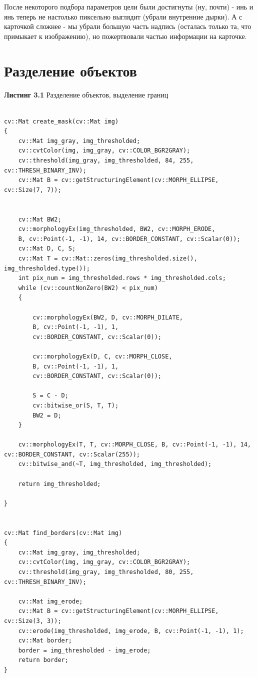 \noindent После некоторого подбора параметров цели были достигнуты (ну, почти) - инь и янь теперь не настолько пиксельно выглядит (убрали внутренние дырки). А с карточкой сложнее - мы убрали большую часть надпись (осталась только та, что примыкает к изображению), но пожертвовали частью информации на карточке.
\newpage
\section{Разделение объектов}
\noindent \textbf{Листинг 3.1} Разделение объектов, выделение границ
\begin{lstlisting}

cv::Mat create_mask(cv::Mat img)
{
    cv::Mat img_gray, img_thresholded;
    cv::cvtColor(img, img_gray, cv::COLOR_BGR2GRAY);
    cv::threshold(img_gray, img_thresholded, 84, 255, cv::THRESH_BINARY_INV);
    cv::Mat B = cv::getStructuringElement(cv::MORPH_ELLIPSE, cv::Size(7, 7));


    cv::Mat BW2;
    cv::morphologyEx(img_thresholded, BW2, cv::MORPH_ERODE, 
    B, cv::Point(-1, -1), 14, cv::BORDER_CONSTANT, cv::Scalar(0));
    cv::Mat D, C, S;
    cv::Mat T = cv::Mat::zeros(img_thresholded.size(), img_thresholded.type());
    int pix_num = img_thresholded.rows * img_thresholded.cols;
    while (cv::countNonZero(BW2) < pix_num)
    {

        cv::morphologyEx(BW2, D, cv::MORPH_DILATE, 
        B, cv::Point(-1, -1), 1,
        cv::BORDER_CONSTANT, cv::Scalar(0));

        cv::morphologyEx(D, C, cv::MORPH_CLOSE,
        B, cv::Point(-1, -1), 1,
        cv::BORDER_CONSTANT, cv::Scalar(0));

        S = C - D;
        cv::bitwise_or(S, T, T);
        BW2 = D;
    }

    cv::morphologyEx(T, T, cv::MORPH_CLOSE, B, cv::Point(-1, -1), 14, cv::BORDER_CONSTANT, cv::Scalar(255));
    cv::bitwise_and(~T, img_thresholded, img_thresholded);

    return img_thresholded;

}


cv::Mat find_borders(cv::Mat img)
{
    cv::Mat img_gray, img_thresholded;
    cv::cvtColor(img, img_gray, cv::COLOR_BGR2GRAY);
    cv::threshold(img_gray, img_thresholded, 80, 255, cv::THRESH_BINARY_INV);
    
    cv::Mat img_erode;
    cv::Mat B = cv::getStructuringElement(cv::MORPH_ELLIPSE, cv::Size(3, 3));
    cv::erode(img_thresholded, img_erode, B, cv::Point(-1, -1), 1);
    cv::Mat border;
    border = img_thresholded - img_erode;
    return border;
}

\end{lstlisting}

